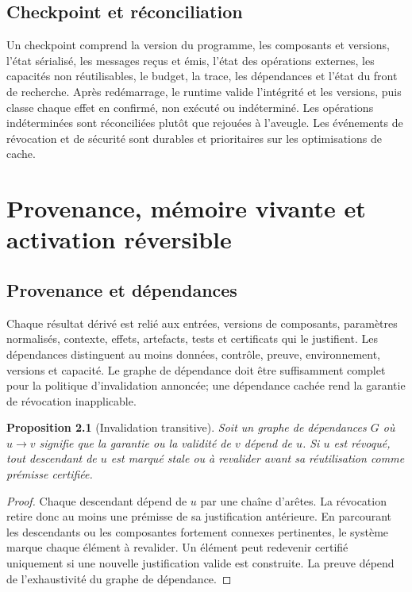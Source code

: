 \documentclass[11pt,a4paper,openany]{book}
\theoremstyle{definition}
\theoremstyle{plain}
\newtheorem{proposition}[definition]{Proposition}
\theoremstyle{remark}
\begin{document}
\section{Checkpoint et réconciliation}
Un checkpoint comprend la version du programme, les composants et versions, l'état sérialisé, les messages reçus et émis, l'état des opérations externes, les capacités non réutilisables, le budget, la trace, les dépendances et l'état du front de recherche. Après redémarrage, le runtime valide l'intégrité et les versions, puis classe chaque effet en confirmé, non exécuté ou indéterminé. Les opérations indéterminées sont réconciliées plutôt que rejouées à l'aveugle. Les événements de révocation et de sécurité sont durables et prioritaires sur les optimisations de cache.

\chapter{Provenance, mémoire vivante et activation réversible}
\section{Provenance et dépendances}
Chaque résultat dérivé est relié aux entrées, versions de composants, paramètres normalisés, contexte, effets, artefacts, tests et certificats qui le justifient. Les dépendances distinguent au moins données, contrôle, preuve, environnement, versions et capacité. Le graphe de dépendance doit être suffisamment complet pour la politique d'invalidation annoncée; une dépendance cachée rend la garantie de révocation inapplicable.

\begin{proposition}[Invalidation transitive]
Soit un graphe de dépendances $G$ où $u\to v$ signifie que la garantie ou la validité de $v$ dépend de $u$. Si $u$ est révoqué, tout descendant de $u$ est marqué stale ou à revalider avant sa réutilisation comme prémisse certifiée.
\end{proposition}
\begin{proof}
Chaque descendant dépend de $u$ par une chaîne d'arêtes. La révocation retire donc au moins une prémisse de sa justification antérieure. En parcourant les descendants ou les composantes fortement connexes pertinentes, le système marque chaque élément à revalider. Un élément peut redevenir certifié uniquement si une nouvelle justification valide est construite. La preuve dépend de l'exhaustivité du graphe de dépendance.
\end{proof}
\end{document}
